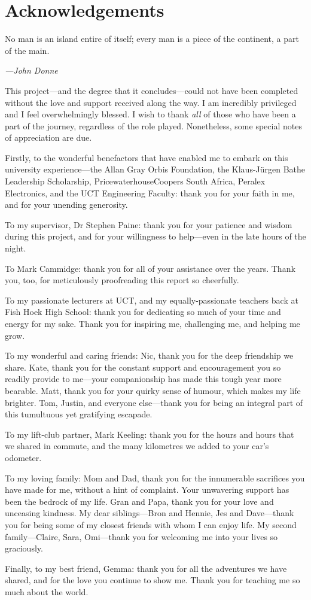 \documentclass[class=report,11pt,crop=false]{standalone}
\begin{document}
\chapter*{Acknowledgements}
\epigraph{No man is an island entire of itself; every man is a piece of the continent, a part of the main.}%
    {\emph{---John Donne}}
\vspace{0.5cm}

This project---and the degree that it concludes---could not have been completed without the love and support received along the way. I am incredibly privileged and I feel overwhelmingly blessed. I wish to thank \emph{all} of those who have been a part of the journey, regardless of the role played. Nonetheless, some special notes of appreciation are due.

Firstly, to the wonderful benefactors that have enabled me to embark on this university experience---the Allan Gray Orbis Foundation, the Klaus-J\"urgen Bathe Leadership Scholarship, PricewaterhouseCoopers South Africa, Peralex Electronics, and the UCT Engineering Faculty: thank you for your faith in me, and for your unending generosity.

To my supervisor, Dr Stephen Paine: thank you for your patience and wisdom during this project, and for your willingness to help---even in the late hours of the night.

To Mark Cammidge: thank you for all of your assistance over the years. Thank you, too, for meticulously proofreading this report so cheerfully.

To my passionate lecturers at UCT, and my equally-passionate teachers back at Fish Hoek High School: thank you for dedicating so much of your time and energy for my sake. Thank you for inspiring me, challenging me, and helping me grow.

To my wonderful and caring friends: Nic, thank you for the deep friendship we share. Kate, thank you for the constant support and encouragement you so readily provide to me---your companionship has made this tough year more bearable. Matt, thank you for your quirky sense of humour, which makes my life brighter. Tom, Justin, and everyone else---thank you for being an integral part of this tumultuous yet gratifying escapade.

To my lift-club partner, Mark Keeling: thank you for the hours and hours that we shared in commute, and the many kilometres we added to your car's odometer.

To my loving family: Mom and Dad, thank you for the innumerable sacrifices you have made for me, without a hint of complaint. Your unwavering support has been the bedrock of my life. Gran and Papa, thank you for your love and unceasing kindness. My dear siblings---Bron and Hennie, Jes and Dave---thank you for being some of my closest friends with whom I can enjoy life. My second family---Claire, Sara, Omi---thank you for welcoming me into your lives so graciously.

Finally, to my best friend, Gemma: thank you for all the adventures we have shared, and for the love you continue to show me. Thank you for teaching me so much about the world.
\end{document}
